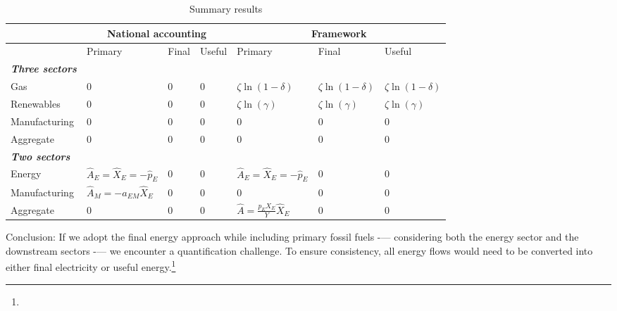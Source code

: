 \documentclass[11pt]{article}
\begin{document}
\begin{table}[H]
\centering
\begin{tabular}{llll|lll}
\toprule
              & \multicolumn{3}{c}{National accounting} & \multicolumn{3}{c}{Framework} \\ \midrule
              & Primary      & Final      & Useful     
              & Primary   & Final   & Useful  \\ 
\midrule
\textbf{\textit{Three sectors}} &              &            &             &           &         &         \\\midrule
Gas           & 0         & 0       &  0          
&   $\zeta \ln(1-\delta)$       &     $\zeta \ln(1-\delta)$      &    $\zeta \ln(1-\delta)$         \\
Renewables    & 0         & 0       &  0           
&      $\zeta \ln(\gamma)$       &       $\zeta \ln(\gamma)$     &   $\zeta \ln(\gamma)$        \\
Manufacturing & 0         & 0       &  0           
&     0     &  0        &     0    \\
Aggregate     & 0         & 0       &  0         
&    0      & 0         &   0      \\ 
 \midrule
\textbf{\textit{Two sectors}}   &              &            &             &           &         &         \\\midrule
Energy        &    $\hat{A}_E=\hat{X}_E=-\hat{p}_E$    & 0       &  0          
&       $\hat{A}_E=\hat{X}_E=-\hat{p}_E$    &   0      &   0      \\
Manufacturing &  $\hat{A}_M=-a_{EM}\hat{X}_E$         & 0       &  0         
&      0     &    0     &       0  \\
Aggregate    & 0         & 0       &  0         
&     $\hat{A}=\frac{p_EX_E}{Y}\hat{X}_E$      &   0      &  0  \\
\bottomrule
\end{tabular}
\caption{Summary results}
\label{table_summary_results_energy}
\end{table}

Conclusion: If we adopt the final energy approach while including primary fossil fuels -— considering both the energy sector and the downstream sectors -— we encounter a quantification challenge. To ensure consistency, all energy flows would need to be converted into either final electricity or useful energy.\footnote{
}
\end{document}
